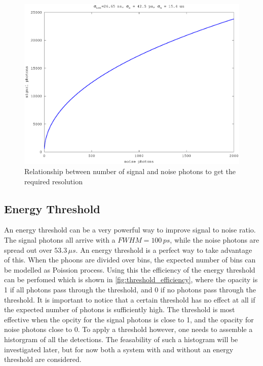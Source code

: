 \begin{figure}[h]
\centering
	\includegraphics[width=0.8\linewidth]{fig/altimetry_s_vs_n_small.eps}
\caption{Relationship between number of signal and noise photons to get the required resolution}
\label{fig:altimetry_s_vs_n_small}
\end{figure}

\subsection{Energy Threshold}\label{sssec:energy_threshold}
An energy threshold can be a very powerful way to improve signal to noise ratio. The signal photons all arrive with a $FWHM = 100\,ps$, while the noise photons are spread out over $53.3\,\mu s$. An energy threshold is a perfect way to take advantage of this. When the phoons are divided over bins, the expected number of bins can be modelled as Poission process. Using this the efficiency of the energy threshold can be perfomed which is shown in \cref{fig:threshold_efficiency}, where the opacity is 1 if all photons pass through the threshold, and 0 if no photons pass through the threshold. It is important to notice that a certain threshold has no effect at all if the expected number of photons is sufficiently high. The threshold is most effective when the opcity for the signal photons is close to 1, and the opacity for noise photons close to 0. To apply a threshold however, one needs to assemble a historgram of all the detections. The feasability of such a histogram will be investigated later, but for now both a system with and without an energy threshold are considered.  

